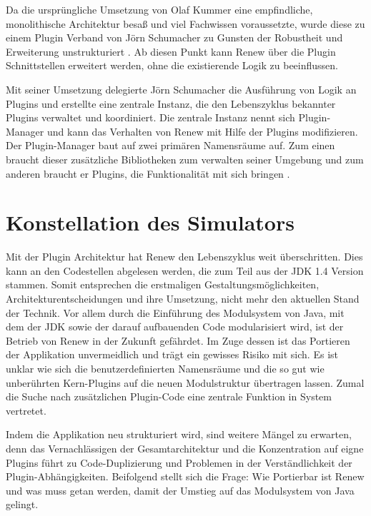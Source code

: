 Da die ursprüngliche Umsetzung von Olaf Kummer eine empfindliche, monolithische Architektur besaß und viel Fachwissen voraussetzte, wurde diese zu einem Plugin Verband von Jörn Schumacher zu Gunsten der Robustheit und Erweiterung unstrukturiert \cite{schummacher}. Ab diesen Punkt kann Renew über die Plugin Schnittstellen erweitert werden, ohne die existierende Logik zu beeinflussen.\bigbreak

Mit seiner Umsetzung delegierte Jörn Schumacher die Ausführung von Logik an Plugins und erstellte eine zentrale Instanz, die den Lebenszyklus bekannter Plugins verwaltet und koordiniert. Die zentrale Instanz nennt sich Plugin-Manager und kann das Verhalten von Renew mit Hilfe der Plugins modifizieren. Der Plugin-Manager baut auf zwei primären Namensräume auf. Zum einen braucht dieser zusätzliche Bibliotheken zum verwalten seiner Umgebung und zum anderen braucht er Plugins, die Funktionalität mit sich bringen \cite{douvigneau}.

\section{Konstellation des Simulators} \label{sec:KdS}

Mit der Plugin Architektur hat Renew den Lebenszyklus weit überschritten. Dies kann an den Codestellen abgelesen werden, die zum Teil aus der JDK 1.4 Version stammen. Somit entsprechen die erstmaligen Gestaltungsmöglichkeiten, Architekturentscheidungen und ihre Umsetzung, nicht mehr den aktuellen Stand der Technik. Vor allem durch die Einführung des Modulsystem von Java, mit dem der JDK sowie der darauf aufbauenden Code modularisiert wird, ist der Betrieb von Renew in der Zukunft gefährdet. Im Zuge dessen ist das Portieren der Applikation unvermeidlich und trägt ein gewisses Risiko mit sich. Es ist unklar wie sich die benutzerdefinierten Namensräume und die so gut wie unberührten Kern-Plugins auf die neuen Modulstruktur übertragen lassen. Zumal die Suche nach zusätzlichen Plugin-Code eine zentrale Funktion in System vertretet.\bigbreak

Indem die Applikation neu strukturiert wird, sind weitere Mängel zu erwarten, denn das Vernachlässigen der Gesamtarchitektur und die Konzentration auf eigne Plugins führt zu Code-Duplizierung und Problemen in der Verständlichkeit der Plugin-Abhängigkeiten.\newline
Beifolgend stellt sich die Frage: Wie Portierbar ist Renew und was muss getan werden, damit der Umstieg auf das Modulsystem von Java gelingt.

